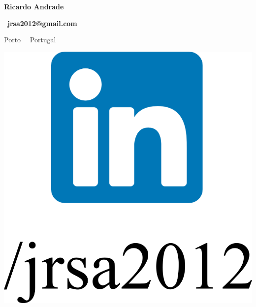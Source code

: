 \documentclass{mycv}
\begin{document}
\begin{center}
	{\LARGE\textbf{Ricardo Andrade}} \\
	\vspace{0.2cm}	
	
	\ \textbf{jrsa2012@gmail.com}
	
	
	
	\vspace{0.2cm}	
	
		Porto~\textbullet 
	\ Portugal

\end{center}

\begin{center}
	
	\href{https://www.linkedin.com/in/jrsa2012}{\includegraphics[scale=0.06]{figs/linkedin_logo_label.png}}
	\ \ \ \ \ \ \ \ \ \ \

\end{center}
\end{document}
